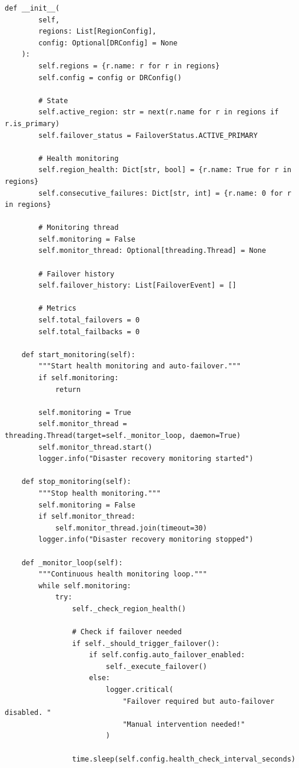 \begin{lstlisting}[style=python, caption={Disaster Recovery Manager}]
    def __init__(
        self,
        regions: List[RegionConfig],
        config: Optional[DRConfig] = None
    ):
        self.regions = {r.name: r for r in regions}
        self.config = config or DRConfig()

        # State
        self.active_region: str = next(r.name for r in regions if r.is_primary)
        self.failover_status = FailoverStatus.ACTIVE_PRIMARY

        # Health monitoring
        self.region_health: Dict[str, bool] = {r.name: True for r in regions}
        self.consecutive_failures: Dict[str, int] = {r.name: 0 for r in regions}

        # Monitoring thread
        self.monitoring = False
        self.monitor_thread: Optional[threading.Thread] = None

        # Failover history
        self.failover_history: List[FailoverEvent] = []

        # Metrics
        self.total_failovers = 0
        self.total_failbacks = 0

    def start_monitoring(self):
        """Start health monitoring and auto-failover."""
        if self.monitoring:
            return

        self.monitoring = True
        self.monitor_thread = threading.Thread(target=self._monitor_loop, daemon=True)
        self.monitor_thread.start()
        logger.info("Disaster recovery monitoring started")

    def stop_monitoring(self):
        """Stop health monitoring."""
        self.monitoring = False
        if self.monitor_thread:
            self.monitor_thread.join(timeout=30)
        logger.info("Disaster recovery monitoring stopped")

    def _monitor_loop(self):
        """Continuous health monitoring loop."""
        while self.monitoring:
            try:
                self._check_region_health()

                # Check if failover needed
                if self._should_trigger_failover():
                    if self.config.auto_failover_enabled:
                        self._execute_failover()
                    else:
                        logger.critical(
                            "Failover required but auto-failover disabled. "
                            "Manual intervention needed!"
                        )

                time.sleep(self.config.health_check_interval_seconds)


\end{lstlisting}
